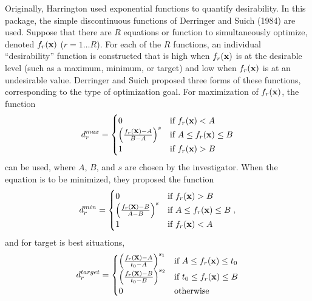 \documentclass[12pt]{article}
\renewcommand{\vec}[1]{\mbox{\bf {#1}}}
\begin{document}
Originally, Harrington used exponential functions to quantify desirability. In this package, the simple discontinuous functions of Derringer and Suich (1984) are used. Suppose that there are $R$ equations or function to simultaneously optimize, denoted $f_r(\vec{x})$ ($r=1\ldots R$). For each of the $R$ functions, an individual ``desirability'' function is constructed that is high when $f_r(\vec{x})$ is at the desirable level (such as a maximum, minimum, or target) and low when  $f_r(\vec{x})$ is at an undesirable value. Derringer and Suich proposed three forms of these functions, corresponding to the type of optimization goal. For maximization of $f_r(\vec{x})$, the function
\begin{equation}\label{E1:Dmax}
d_r^{max}=
\begin{cases}
	0		&\text{if $f_r(\vec{x})< A$}	\\
	\left(\frac{f_r(\vec{x})-A}{B-A}\right)^{s}		
			&\text{if $A \leq f_r(\vec{x}) \leq B$}	\\
	1		&\text{if $f_r(\vec{x})>B$}
\end{cases}
\end{equation}
\noindent can be used, where $A$, $B$, and $s$ are chosen by the investigator. When the equation is to be minimized, they proposed the function
\begin{equation}\label{E1:Dmin}
d_r^{min}=
\begin{cases}
	0		&\text{if $f_r(\vec{x})> B$}	\\
	\left(\frac{f_r(\vec{x})-B}{A-B}\right)^{s}		
			&\text{if $A \leq f_r(\vec{x}) \leq B$}	\\
	1		&\text{if $f_r(\vec{x})< A$}
\end{cases},
\end{equation}
\noindent and for target is best situations,
\begin{equation}\label{E1:Dtarget}
d_r^{target}=
\begin{cases}
	\left(\frac{f_r(\vec{x})-A}{t_0-A}\right)^{s_1}		
			&\text{if $A \leq f_r(\vec{x}) \leq t_0$}	\\
	\left(\frac{f_r(\vec{x})-B}{t_0-B}\right)^{s_2}		
			&\text{if $t_0 \leq f_r(\vec{x}) \leq B$}	\\
	0		&\text{otherwise}	\\
\end{cases}
\end{equation}
\end{document}

